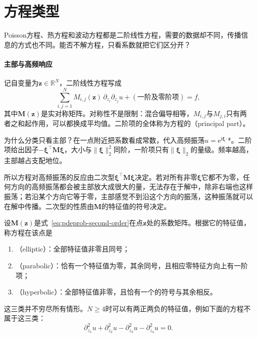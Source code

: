 \section{方程类型}
\label{sec:pdeprob-types}

Poisson方程、热方程和波动方程都是二阶线性方程，需要的数据却不同，传播信息的方式也不同。能否不解方程，只看系数就把它们区分开？

\paragraph{主部与高频响应}
记自变量为$\bm{z}\in\mathbb{R}^{N}$，二阶线性方程写成
\begin{equation}
  \sum_{i,j=1}^{N}M_{i,j}(\bm{z})\,\partial_{z_i}\partial_{z_j}u+(\text{一阶及零阶项})=f,
  \label{eq:pdeprob-second-order}
\end{equation}
其中$\bm{M}(\bm{z})$是实对称矩阵。对称性不是限制：混合偏导相等，$M_{i,j}$与$M_{j,i}$只有两者之和起作用，可以都换成平均值。二阶项的全体称为方程的（principal part）。

为什么分类只看主部？在一点附近把系数看成常数，代入高频振荡$u=\mathrm{e}^{\mathrm{i}\bm{\xi}\cdot\bm{z}}$。二阶项给出因子$-\bm{\xi}^{\top}\bm{M}\bm{\xi}$，大小与$\lVert\bm{\xi}\rVert_2^{2}$同阶，一阶项只有$\lVert\bm{\xi}\rVert_2$的量级。频率越高，主部越占支配地位。

所以方程对高频振荡的反应由二次型$\bm{\xi}^{\top}\bm{M}\bm{\xi}$决定。若对所有非零$\bm{\xi}$它都不为零，任何方向的高频振荡都会被主部放大成很大的量，无法存在于解中，除非右端也这样振荡；若沿某个方向它等于零，主部感觉不到沿这个方向的振荡，这种振荡就可以在解中传播。二次型的性质由$\bm{M}$的特征值的符号决定。

\begin{definition}[二阶线性方程的类型]
\label{def:pdeprob-types}
设$\bm{M}(\bm{z})$是式~\eqref{eq:pdeprob-second-order}在点$\bm{z}$处的系数矩阵。根据它的特征值，称方程在该点是
\begin{enumerate}
  \item {}（elliptic）：全部特征值非零且同号；
  \item {}（parabolic）：恰有一个特征值为零，其余同号，且相应零特征方向上有一阶项；
  \item {}（hyperbolic）：全部特征值非零，且恰有一个的符号与其余相反。
\end{enumerate}
\end{definition}

这三类并不穷尽所有情形。$N\geq4$时可以有两正两负的特征值，例如下面的方程不属于这三类：
\[
  \partial_{z_1}^{2}u+\partial_{z_2}^{2}u-\partial_{z_3}^{2}u-\partial_{z_4}^{2}u=0.
\]

